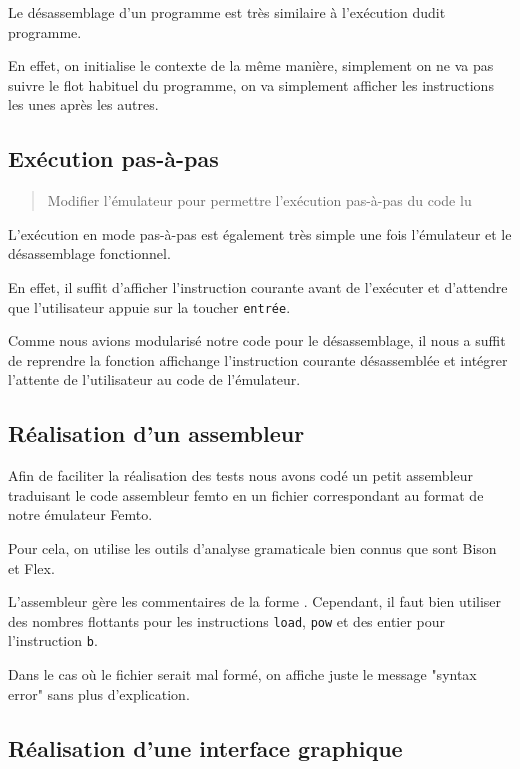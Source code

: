 \documentclass[11pt,a4paper]{article}
\begin{document}
Le désassemblage d'un programme est très similaire à l'exécution dudit programme.

En effet, on initialise le contexte de la même manière, simplement on ne va pas suivre le flot
habituel du programme, on va simplement afficher les instructions les unes après les autres.

\subsection{Exécution pas-à-pas}

\begin{quote}
Modifier l’émulateur pour permettre l’exécution pas-à-pas du code lu
\end{quote}

L'exécution en mode pas-à-pas est également très simple une fois l'émulateur et le désassemblage
fonctionnel.

En effet, il suffit d'afficher l'instruction courante avant de l'exécuter et d'attendre que
l'utilisateur appuie sur la toucher \texttt{entrée}.

Comme nous avions modularisé notre code pour le désassemblage, il nous a suffit de reprendre la
fonction affichange l'instruction courante désassemblée et intégrer l'attente de l'utilisateur au
code de l'émulateur.

\subsection{Réalisation d'un assembleur}

Afin de faciliter la réalisation des tests nous avons codé un petit assembleur traduisant le code
assembleur femto en un fichier correspondant au format de notre émulateur Femto.

Pour cela, on utilise les outils d'analyse gramaticale bien connus que sont Bison et Flex.

L'assembleur gère les commentaires de la forme \texttt{\/\/}. Cependant, il faut bien utiliser des
nombres flottants pour les instructions \texttt{load}, \texttt{pow} et des entier pour l'instruction
\texttt{b}.

Dans le cas où le fichier serait mal formé, on affiche juste le message "syntax error" sans plus
d'explication.

\subsection{Réalisation d'une interface graphique}
\end{document}
